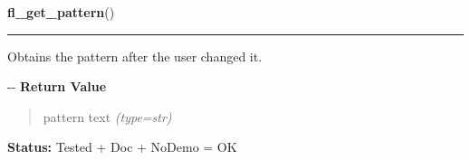     \label{xformslib:flgoodies:fl_get_pattern}

    \vspace{0.5ex}

\hspace{.8\funcindent}\begin{boxedminipage}{\funcwidth}

    \raggedright \textbf{fl\_get\_pattern}()

    \vspace{-1.5ex}

    \rule{\textwidth}{0.5\fboxrule}
\setlength{\parskip}{2ex}

Obtains the pattern after the user changed it.

-{}-
\setlength{\parskip}{1ex}
      \textbf{Return Value}
    \vspace{-1ex}

      \begin{quote}

pattern text
      {\it (type=str)}

      \end{quote}

\textbf{Status:} 
Tested + Doc + NoDemo = OK


    \end{boxedminipage}

    \label{xformslib:flgoodies:fl_set_directory}

    \vspace{0.5ex}

